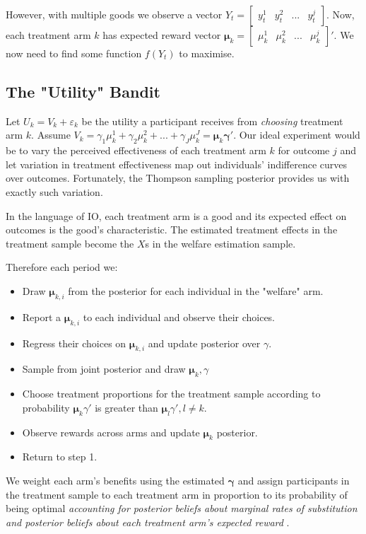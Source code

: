 \documentclass{article}
\begin{document}
However, with multiple goods we observe a  vector  $Y_t = \begin{bmatrix} y^1_t & y^2_t & ... & y^j_t\end{bmatrix}$.
Now, each treatment arm $k$ has expected reward vector $\bm{\mu}_k = \begin{bmatrix}
    \mu^1_k & \mu^2_k & ... & \mu^j_k
\end{bmatrix}'$. We now need to find some function $f(Y_t)$ to maximise. 

\subsection*{The "Utility" Bandit}

Let $U_k = V_k + \varepsilon_k$ be the utility a 
participant receives from \textit{choosing} treatment arm $k$. Assume $V_k = 
\gamma_1 \mu^1_k + \gamma_2 \mu^2_k + ... + \gamma_J \mu^J_k = \bm{\mu}_k\bm{\gamma}'$. Our ideal experiment would be to vary the perceived effectiveness of each treatment arm $k$ for 
outcome $j$ and let variation in treatment effectiveness map out individuals' 
indifference curves over outcomes. Fortunately, the Thompson sampling posterior 
provides us with exactly such variation.


In the language of IO, each treatment arm is a good and its expected effect on outcomes 
is the good's characteristic. The estimated treatment effects in the treatment sample 
become the $X$s in the welfare estimation sample.

Therefore each period we:

    \begin{itemize}
        \item Draw $\bm{\mu}_{k, i}$ from the posterior for each individual in the "welfare" arm. 
        \item Report a $\bm{\mu}_{k, i}$ to each individual and observe their choices.
        \item Regress their choices on $\bm{\mu}_{k,i}$ and update posterior over $\gamma$.
        \item Sample from joint posterior and draw $\bm{\mu}_{k}, \gamma$
        \item Choose treatment proportions for the treatment sample according to probability  $\bm{\mu}_k \gamma'$ is 
        greater than $\bm{\mu}_l \gamma', l \neq k$.
        \item Observe rewards across arms and update $\bm{\mu}_k$ posterior.
        \item Return to step 1.
         \end{itemize}


We weight each arm's benefits using the estimated $\bm{\gamma}$ and 
assign participants in the treatment sample to each treatment arm in proportion to its probability of being optimal \textit{
    accounting for posterior beliefs about marginal rates of substitution and 
    posterior beliefs about each treatment arm's expected reward
}.
\end{document}
